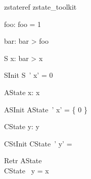 
\begin{zsection}
   \SECTION zstateref \parents zstate\_toolkit
\end{zsection}

\begin{axdef}
   foo: \nat
\where
   foo = 1
\end{axdef}

\begin{axdef}
   bar: \nat
\where
   bar > foo
\end{axdef}

\zstate
\begin{schema}{S}
   x: \nat
\where
   bar > x
\end{schema}

\zstinit
\begin{schema}{SInit}
   S~'
\where
   x' = 0
\end{schema}

\zastate
\begin{schema}{AState}
   x: \power \nat
\where
  x \neq \emptyset
\end{schema}

\zastinit
\begin{schema}{ASInit}
   AState~'
\where
   x' = \{ 0 \}
\end{schema}

\zcstate
\begin{schema}{CState}
  y: \seq \nat
\where
   y \neq \langle \rangle
\end{schema}

\zcstinit
\begin{schema}{CStInit}
   CState~'
\where
  y' =  \rangle
\end{schema}

\zretrieve
\begin{schema}{Retr}
   AState \\
   CState
\where
   \ran~y = x
\end{schema}
